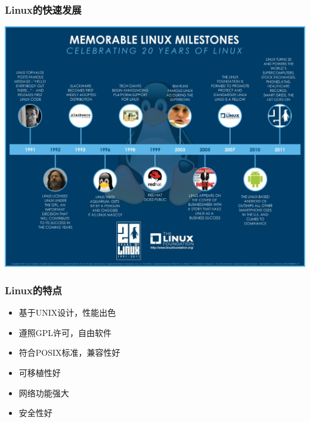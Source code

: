 \documentclass[xcolor=svgnames,presentation]{beamer}
\begin{document}
\begin{frame}
\frametitle{Linux的快速发展}
\label{sec-2-3-3}

\begin{center}
\includegraphics[width=.9\linewidth]{img/20year.jpg}
\end{center}
\end{frame}
\begin{frame}
\frametitle{Linux的特点}
\label{sec-2-3-4}
\begin{itemize}

\item 基于UNIX设计，性能出色
\label{sec-2-3-4-1}%

\item 遵照GPL许可，自由软件
\label{sec-2-3-4-2}%

\item 符合POSIX标准，兼容性好
\label{sec-2-3-4-3}%

\item 可移植性好
\label{sec-2-3-4-4}%

\item 网络功能强大
\label{sec-2-3-4-5}%

\item 安全性好
\label{sec-2-3-4-6}%
\end{itemize} %
\end{frame}
\end{document}
